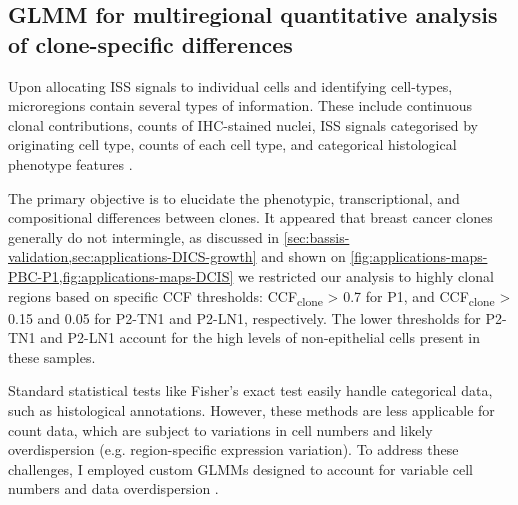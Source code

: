\subsection{\acs{GLMM} for multiregional quantitative analysis of clone-specific differences}
\label{sec:modalities-glmm}

Upon allocating \ac{ISS} signals to individual cells and identifying cell-types, microregions contain several types of information. These include continuous clonal contributions, counts of \ac{IHC}-stained nuclei, \ac{ISS} signals categorised by originating cell type, counts of each cell type, and categorical histological phenotype features .


The primary objective is to elucidate the phenotypic, transcriptional, and compositional differences between clones. It appeared that breast cancer clones generally do not intermingle, as discussed in \cref{sec:bassis-validation,sec:applications-DICS-growth} and shown on \cref{fig:applications-maps-PBC-P1,fig:applications-maps-DCIS} we restricted our analysis to highly clonal regions based on specific \ac{CCF} thresholds: \ac{CCF}\textsubscript{clone} > 0.7 for P1, and \ac{CCF}\textsubscript{clone} > 0.15 and 0.05 for P2-TN1 and P2-LN1, respectively. The lower thresholds for P2-TN1 and P2-LN1 account for the high levels of non-epithelial cells present in these samples.

Standard statistical tests like Fisher's exact test easily handle categorical data, such as histological annotations. However, these methods are less applicable for count data, which are subject to variations in cell numbers and likely overdispersion (e.g. region-specific expression variation). To address these challenges, I employed custom \acfp{GLMM} designed to account for variable cell numbers and data overdispersion .

